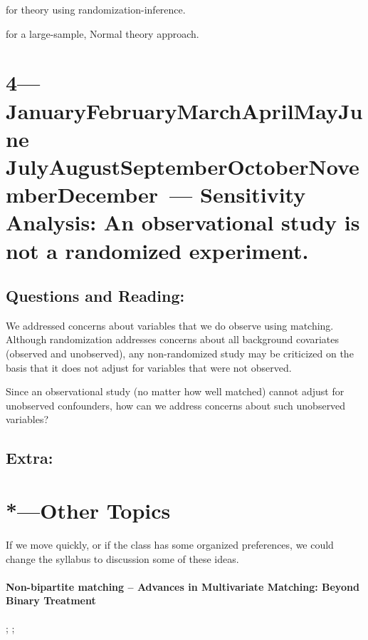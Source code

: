 \documentclass[10pt, letterpaper]{article}
\def\themonth{\ifcase\month\or
  January\or February\or March\or April\or May\or June\or
  July\or August\or September\or October\or November\or December\fi}
\begin{document}
\cite{hansen2009prop} for theory using randomization-inference.

\cite{abadie2009matching} for a large-sample, Normal theory approach.


\AdvanceDate[1]
\section{4---\themonth~\the\day--- Sensitivity Analysis: An observational study is not a randomized experiment.}

\subsection{Questions and Reading:}

We addressed concerns about variables that we do observe using matching.
Although randomization addresses concerns about all background covariates
(observed and unobserved), any non-randomized study may be criticized on the
basis that it does not adjust for variables that were not observed.

Since an observational study (no matter how well matched) cannot adjust for
unobserved confounders, how can we address concerns about such unobserved
variables?

\cite{cornfield:1959}

\cite{hosman2010}

\subsection{Extra:}

\citealp[Chap 4]{rosenbaum:2002}

\citealp[Chap 3, 14]{rosenbaum2010design}

\cite{imbens2003sea}


\section{*---Other Topics}

If we move quickly, or if the class has some organized preferences, we could
change the syllabus to discussion some of these ideas.


\paragraph{Non-bipartite matching -- Advances in Multivariate Matching: Beyond Binary Treatment }
\citealp[Chap 11]{rosenbaum2010design}; \cite{lu2011optimal}; \cite{imaivandyk:04}
\end{document}
